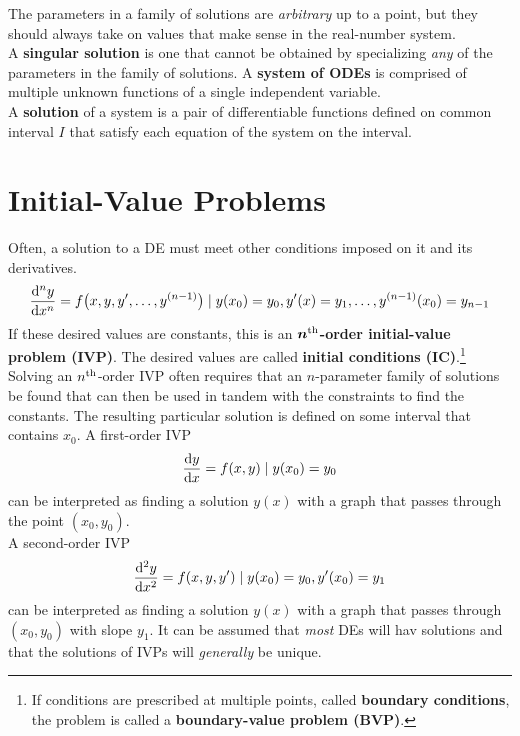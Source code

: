 \documentclass[../Differential Equations.tex]{subfiles}
\begin{document}
			The parameters in a family of solutions are \textit{arbitrary} up to a point, but they should always take on values that make sense in the real-number system. \\
			A \textbf{singular solution} is one that cannot be obtained by specializing \textit{any} of the parameters in the family of solutions.
			A \textbf{system of ODEs} is comprised of multiple unknown functions of a single independent variable. \\
			A \textbf{solution} of a system is a pair of differentiable functions defined on common interval \(I\) that satisfy each equation of the system on the interval.
	\section{Initial-Value Problems}
		Often, a solution to a DE must meet other conditions imposed on it and its derivatives. \\
			\[\dv[n]{y}{x} = f\bigl(x, y, y', \ldots, y^{(n - 1)}\bigr) \mid y(x_0) = y_0, y'(x) = y_1, \ldots, y^{(n - 1)}(x_0) = y_{n - 1}\]
			If these desired values are constants, this is an \textbf{\(\bm{n^{\text{th}}}\)-order initial-value problem (IVP)}. The desired values are called \textbf{initial conditions (IC)}.\footnote{
					If conditions are prescribed at multiple points, called \textbf{boundary conditions}, the problem is called a \textbf{boundary-value problem (BVP)}.
				} \\
		Solving an \(n^{\text{th}}\)-order IVP often requires that an \(n\)-parameter family of solutions be found that can then be used in tandem with the constraints to find the constants. The resulting particular solution is defined on some interval that contains \(x_0\).
			A first-order IVP
				\[\dv{y}{x} = f(x, y) \mid y(x_0) = y_0\]
				can be interpreted as finding a solution \(y(x)\) with a graph that passes through the point \((x_0, y_0)\). \\
			A second-order IVP
				\[\dv[2]{y}{x} = f(x, y, y') \mid y(x_0) = y_0, y'(x_0) = y_1\]
				can be interpreted as finding a solution \(y(x)\) with a graph that passes through \((x_0, y_0)\) with slope \(y_1\).
			It can be assumed that \textit{most} DEs will hav solutions and that the solutions of IVPs will \textit{generally} be unique. \\
\end{document}
